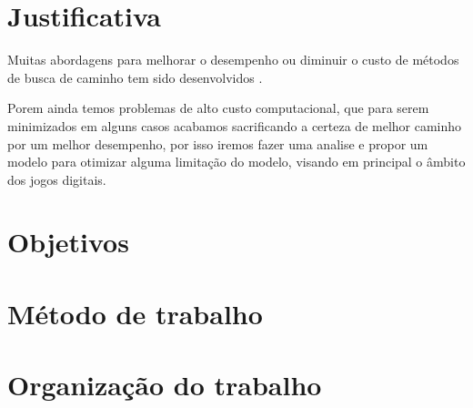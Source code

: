 \section{Justificativa}

Muitas abordagens para melhorar o desempenho ou diminuir o custo de métodos de busca de caminho tem sido desenvolvidos \cite{Ulysses}  \cite{Pollack} \cite{Pollack} \cite{Timothy} \cite{WilliamMiller}. 

Porem ainda temos problemas de alto custo computacional, que para serem minimizados em alguns casos acabamos sacrificando a certeza de melhor caminho \cite{Botea} por um melhor desempenho, por isso iremos fazer uma analise e propor um modelo para otimizar alguma limitação do modelo, visando em principal o âmbito dos jogos digitais.

\section{Objetivos}


\section{Método de trabalho}


\section{Organização do trabalho}


